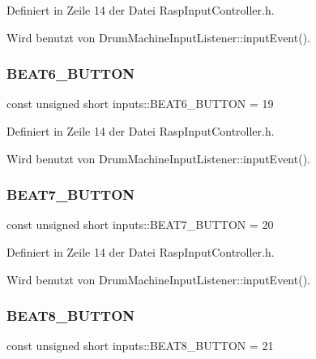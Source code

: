 Definiert in Zeile 14 der Datei Rasp\+Input\+Controller.\+h.



Wird benutzt von Drum\+Machine\+Input\+Listener\+::input\+Event().

\mbox{\label{namespaceinputs_a6afdc23bce21454342081cf937e47ab9}} 
\subsubsection{\texorpdfstring{B\+E\+A\+T6\+\_\+\+B\+U\+T\+T\+ON}{BEAT6\_BUTTON}}
{\footnotesize\ttfamily const unsigned short inputs\+::\+B\+E\+A\+T6\+\_\+\+B\+U\+T\+T\+ON = 19}



Definiert in Zeile 14 der Datei Rasp\+Input\+Controller.\+h.



Wird benutzt von Drum\+Machine\+Input\+Listener\+::input\+Event().

\mbox{\label{namespaceinputs_ac74e302394a578b31f0cf44df8cbb1a9}} 
\subsubsection{\texorpdfstring{B\+E\+A\+T7\+\_\+\+B\+U\+T\+T\+ON}{BEAT7\_BUTTON}}
{\footnotesize\ttfamily const unsigned short inputs\+::\+B\+E\+A\+T7\+\_\+\+B\+U\+T\+T\+ON = 20}



Definiert in Zeile 14 der Datei Rasp\+Input\+Controller.\+h.



Wird benutzt von Drum\+Machine\+Input\+Listener\+::input\+Event().

\mbox{\label{namespaceinputs_abfcd4d28221c436391131a27402ea620}} 
\subsubsection{\texorpdfstring{B\+E\+A\+T8\+\_\+\+B\+U\+T\+T\+ON}{BEAT8\_BUTTON}}
{\footnotesize\ttfamily const unsigned short inputs\+::\+B\+E\+A\+T8\+\_\+\+B\+U\+T\+T\+ON = 21}



